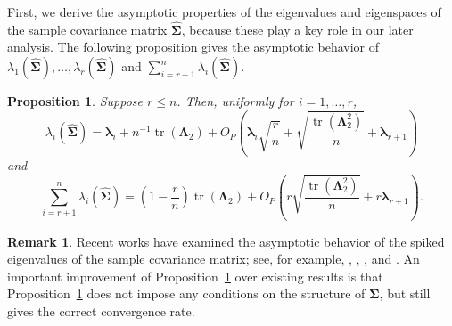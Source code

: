 \documentclass[12pt]{article} %
\DeclareMathOperator{\mytr}{tr}
\newcommand{\bZ}{\mathbf{Z}}
\newcommand{\bfsym}[1]{\ensuremath{\boldsymbol{#1}}}
\def\blambda {\bfsym {\lambda}}
\def\bLambda {\bfsym {\Lambda}}
\def\bSigma {\bfsym {\Sigma}}
\newtheorem{proposition}{Proposition}
\theoremstyle{definition}
\newtheorem{remark}{Remark}
\begin{document}
First, we derive the asymptotic properties of the eigenvalues and eigenspaces of the sample covariance matrix $\hat{\bSigma}$, because these play a key role in our later analysis.
    The following proposition gives the asymptotic behavior of $\lambda_1(\hat{\bSigma}),\ldots, \lambda_r(\hat{\bSigma})$ and $\sum_{i=r+1}^n\lambda_i(\hat{\bSigma})$.
\begin{proposition}
    \label{eigenvalueProp}
    Suppose $r\leq n$.
    Then, uniformly for $i=1,\ldots, r$, 
\begin{equation*}
    \lambda_i(\hat{\bSigma})
        =
        \blambda_i
        +
        n^{-1}\mytr(\bLambda_2)
        +O_P\left(\blambda_i \sqrt{\frac{r}{n}}+\sqrt{\frac{\mytr(\bLambda_2^2)}{ n}}+\blambda_{r+1}\right)
    \end{equation*}
        and
\begin{equation*}
     \sum_{i=r+1}^n\lambda_i(\hat{\bSigma})
    =
    \left(1-\frac{r}{n}\right)\mytr(\bLambda_2)
    +O_P\left(r\sqrt{\frac{\mytr(\bLambda_2^2)}{ n}}+r\blambda_{r+1}\right)
    .
\end{equation*}
\end{proposition}

\begin{remark}
Recent works have examined the asymptotic behavior of the spiked eigenvalues of the sample covariance matrix; see, for example, \cite{Yata2013PCA}, \cite{Shen2016A}, \cite{wang2017As}, and \cite{Cai2017Limiting}.
An important improvement of Proposition~\ref{eigenvalueProp} over existing results is that Proposition~\ref{eigenvalueProp} does not impose any conditions on the structure of $\bSigma$, but still gives the correct convergence rate.
\end{remark}
\end{document}
